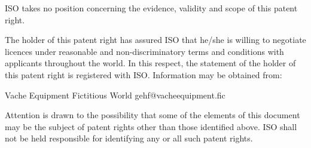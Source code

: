 ISO takes no position concerning the evidence, validity and scope of this patent right.

The holder of this patent right has assured ISO that he/she is willing to negotiate licences under reasonable and non-discriminatory terms and conditions with applicants throughout the world. In this respect, the statement of the holder of this patent right is registered with ISO. Information may be obtained from:

\begin{flushleft}
  Vache Equipment\newline
  Fictitious\newline
  World\newline
  gehf@vacheequipment.fic
\end{flushleft}

Attention is drawn to the possibility that some of the elements of this document may be the subject of patent rights other than those identified above. ISO shall not be held responsible for identifying any or all such patent rights.
